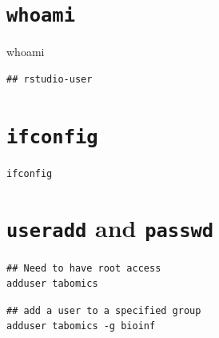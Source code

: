 \documentclass[]{book}
\makeatletter
\newenvironment{Shaded}{\begin{snugshade}}{\end{snugshade}}
\newcommand{\FunctionTok}[1]{\textcolor[rgb]{0.00,0.00,0.00}{#1}}
\newenvironment{kframe}{%
\medskip{}
\setlength{\fboxsep}{.8em}
 \def\at@end@of@kframe{}%
 \ifinner\ifhmode%
  \def\at@end@of@kframe{\end{minipage}}%
  \begin{minipage}{\columnwidth}%
 \fi\fi%
 \def\FrameCommand##1{\hskip\@totalleftmargin \hskip-\fboxsep
 \colorbox{shadecolor}{##1}\hskip-\fboxsep
     \hskip-\linewidth \hskip-\@totalleftmargin \hskip\columnwidth}%
 \MakeFramed {\advance\hsize-\width
   \@totalleftmargin\z@ \linewidth\hsize
   \@setminipage}}%
 {\par\unskip\endMakeFramed%
 \at@end@of@kframe}
\renewenvironment{Shaded}{\begin{kframe}}{\end{kframe}}
\makeatother
\begin{document}
\hypertarget{whoami}{%
\section{\texorpdfstring{\texttt{whoami}}{whoami}}\label{whoami}}

\begin{Shaded}
\begin{Highlighting}[]
\FunctionTok{whoami}
\end{Highlighting}
\end{Shaded}

\begin{verbatim}
## rstudio-user
\end{verbatim}

\hypertarget{ifconfig}{%
\section{\texorpdfstring{\texttt{ifconfig}}{ifconfig}}\label{ifconfig}}

\begin{verbatim}
ifconfig
\end{verbatim}

\hypertarget{useradd-and-passwd}{%
\section{\texorpdfstring{\texttt{useradd} and \texttt{passwd}}{useradd and passwd}}\label{useradd-and-passwd}}

\begin{verbatim}
## Need to have root access
adduser tabomics 
\end{verbatim}

\begin{verbatim}
## add a user to a specified group
adduser tabomics -g bioinf
\end{verbatim}


\end{document}
